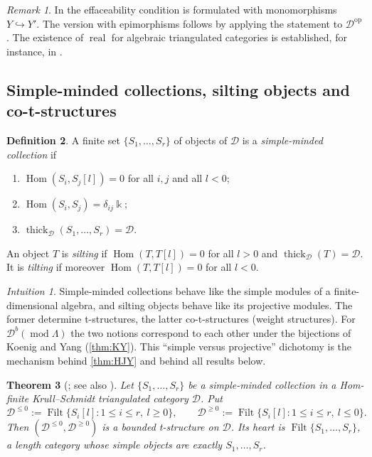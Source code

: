 \documentclass[11pt,reqno]{amsart}
\theoremstyle{plain}
\newtheorem{theorem}{Theorem}[section]
\theoremstyle{definition}
\newtheorem{definition}[theorem]{Definition}
\theoremstyle{remark}
\newtheorem{remark}[theorem]{Remark}
\newtheorem*{intuition}{Intuition}
\newcommand{\kk}{\Bbbk}
\DeclareMathOperator{\Hom}{Hom}
\DeclareMathOperator{\Filt}{Filt}
\DeclareMathOperator{\real}{real}
\newcommand{\modd}{\operatorname{mod}}
\newcommand{\Db}{\mathcal{D}^b}
\newcommand{\thick}[2][\cD]{\operatorname{thick}_{#1}(#2)}
\newcommand{\cD}{\mathcal{D}}
\begin{document}
\begin{remark}
In \cite[Prop.~3.1.16]{BBD82} the effaceability condition is formulated with monomorphisms $Y\hookrightarrow Y'$. The version with epimorphisms follows by applying the statement to $\cD^{\mathrm{op}}$. The existence of $\real$ for algebraic triangulated categories is established, for instance, in \cite{Let24}.
\end{remark}

\subsection{Simple-minded collections, silting objects and co-t-structures}

\begin{definition}\label{def:smc}
A finite set $\{S_1,\dots,S_r\}$ of objects of $\cD$ is a \emph{simple-minded collection} if
\begin{enumerate}
\item[(SM1)] $\Hom(S_i,S_j[l])=0$ for all $i,j$ and all $l<0$;
\item[(SM2)] $\Hom(S_i,S_j)=\delta_{ij}\kk$;
\item[(SM3)] $\thick{S_1,\dots,S_r}=\cD$.
\end{enumerate}
An object $T$ is \emph{silting} if $\Hom(T,T[l])=0$ for all $l>0$ and $\thick{T}=\cD$. It is \emph{tilting} if moreover $\Hom(T,T[l])=0$ for all $l<0$.
\end{definition}

\begin{intuition}
Simple-minded collections behave like the simple modules of a finite-dimensional algebra, and silting objects behave like its projective modules. The former determine t-structures, the latter co-t-structures (weight structures). For $\Db(\modd\Lambda)$ the two notions correspond to each other under the bijections of Koenig and Yang (\cref{thm:KY}). This ``simple versus projective'' dichotomy is the mechanism behind \cref{thm:HJY} and behind all results below.
\end{intuition}

\begin{theorem}[{\cite{AN09}; see also \cite[\S5]{KY14}}]\label{thm:smc}
Let $\{S_1,\dots,S_r\}$ be a simple-minded collection in a Hom-finite Krull--Schmidt triangulated category $\cD$. Put
\[\cD^{\le0}:=\Filt\{S_i[l]: 1\le i\le r,\ l\ge0\},\qquad \cD^{\ge0}:=\Filt\{S_i[l]:1\le i\le r,\ l\le0\}.\]
Then $(\cD^{\le0},\cD^{\ge0})$ is a bounded t-structure on $\cD$. Its heart is $\Filt\{S_1,\dots,S_r\}$, a length category whose simple objects are exactly $S_1,\dots,S_r$.
\end{theorem}
\end{document}
